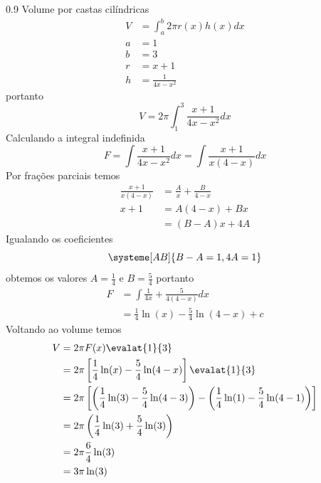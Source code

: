 \documentclass[a4paper,12pt,fleqn]{article}
\newenvironment{resposta}%
  {\begingroup\color{blue}\small\begin{spacing}{0.9}}%
  {\end{spacing}\endgroup}
\begin{document}
\begin{resposta}
  Volume por castas cilíndricas
  \begin{align*}
    V & = \int_a^b 2\pi r(x) h(x) dx \\
    a & = 1 \\
    b & = 3 \\
    r & = x+1 \\
    h & = \frac{1}{4x-x^2}
  \end{align*}
  portanto
  \[
    V = 2\pi \int_1^3 \frac{x+1}{4x-x^2} dx
  \]
  Calculando a integral indefinida
  \[
    F = \int \frac{x+1}{4x-x^2} dx = \int \frac{x+1}{x(4-x)} dx
  \]
  Por frações parciais temos
  \begin{align*}
    \frac{x+1}{x(4-x)} & = \frac{A}{x} + \frac{B}{4-x} \\
    x+1                & = A(4-x) + Bx                 \\
                       & = (B-A)x + 4A
  \end{align*}
  Igualando os coeficientes
  \[
    \systeme[AB]{B-A=1,4A=1}
  \]
  obtemos os valores
  \(A=\frac{1}{4}\) e
  \(B=\frac{5}{4}\)
  portanto
  \begin{align*}
    F & = \int \frac{1}{4x} + \frac{5}{4(4-x)} dx \\
      & = \frac{1}{4}\ln(x) - \frac{5}{4}\ln(4-x) + c
  \end{align*}
  Voltando ao volume temos
  \begin{align*}
    V & = 2\pi F(x)\evalat{1}{3} \\
      & = 2\pi \left[\frac{1}{4}\ln(x) - \frac{5}{4}\ln(4-x)\right] \evalat{1}{3} \\
      & = 2\pi \left[
                 \left(\frac{1}{4}\ln(3) - \frac{5}{4}\ln(4-3)\right)
               - \left(\frac{1}{4}\ln(1) - \frac{5}{4}\ln(4-1)\right)
               \right] \\
      & = 2\pi \left(\frac{1}{4}\ln(3) + \frac{5}{4}\ln(3)\right) \\
      & = 2\pi \frac{6}{4}\ln(3) \\
      & = 3\pi \ln(3)
  \end{align*}
\end{resposta}

\end{document}
